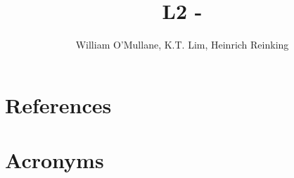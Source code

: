 \documentclass[OPS,authoryear,toc]{lsstdoc}
\title{L2 - \milestone}
\author{%
William O'Mullane, K.T. Lim, Heinrich Reinking
}
\date{\vcsDate}
\begin{document}
\maketitle



\appendix





\section{References} \label{sec:bib}
\renewcommand{\refname}{} %


\section{Acronyms} \label{sec:acronyms}

\end{document}
